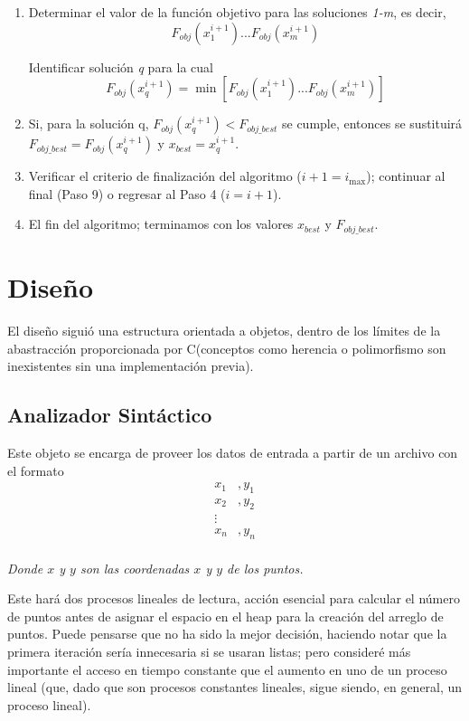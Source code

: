 \documentclass[a4paper]{report}
\begin{document}
\begin{enumerate}
  \item Determinar el valor de la funci\'on objetivo para las soluciones \textit{1-m}, es decir,
    \[F_{obj}(x_1^{i+1})...F_{obj}(x_m^{i+1})\]

    Identificar soluci\'on \textit{q} para la cual
    \[F_{obj}(x_q^{i+1}) = \min[F_{obj}(x_1^{i+1})... F_{obj}(x_m^{i+1})]\]

  \item Si, para la soluci\'on q, $F_{obj}(x_q^{i+1}) < F_{obj\_best}$ se cumple, entonces
    se sustituir\'a $F_{obj\_best} = F_{obj}(x_q^{i+1})$ y $x_{best} = x_q^{i+1}$.
  \item Verificar el criterio de finalizaci\'on del algoritmo ($i+1 = i_{\max}$); continuar al
    final (Paso 9) o regresar al Paso 4 ($i = i+1$).
  \item El fin del algoritmo; terminamos con los valores $x_{best}$ y $F_{obj\_best}$.
  \end{enumerate}

  \chapter{Dise\~no}
  El dise\~no sigui\'o una estructura orientada a objetos, dentro de los l\'imites de la
  abastracci\'on proporcionada por C(conceptos como herencia o polimorfismo son inexistentes
  sin una implementaci\'on previa).

  \section{Analizador Sint\'actico}
  Este objeto se encarga de proveer los datos de entrada a partir de un archivo con el formato
  \begin{align*}
    x_1&,y_1\\
    x_2&,y_2\\
    \vdots\\
    x_n&,y_n\\
  \end{align*}
  \begin{center}
    \tiny{\textit{Donde $x$ y $y$ son las coordenadas $x$ y $y$ de los puntos.}}
  \end{center}

  Este har\'a dos procesos lineales de lectura, acci\'on esencial para calcular el n\'umero de
  puntos antes de asignar el espacio en el heap para la creaci\'on del arreglo de puntos.
  Puede pensarse que no ha sido la mejor decisi\'on, haciendo notar que la primera iteraci\'on
  ser\'ia innecesaria si se usaran listas; pero consider\'e m\'as importante el acceso en tiempo
  constante que el aumento en uno de un proceso lineal (que, dado que son procesos constantes
  lineales, sigue siendo, en general, un proceso lineal).
\end{document}
